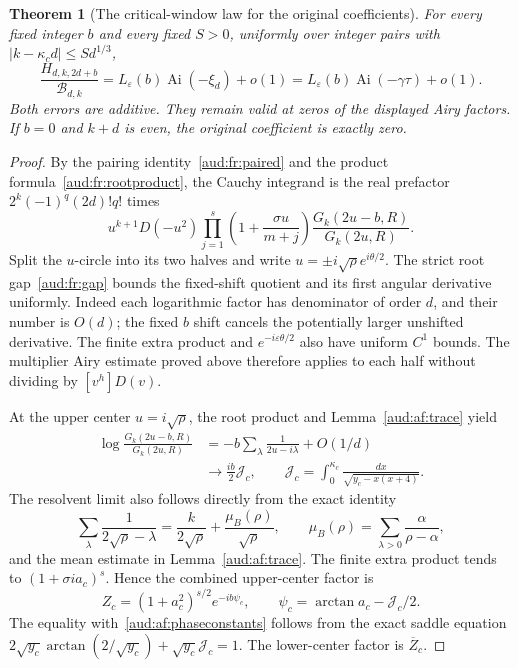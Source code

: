 \documentclass[11pt,a4paper]{article}
\numberwithin{equation}{section}
\newtheorem{theorem}{Theorem}[section]
\newcommand{\Ai}{\operatorname{Ai}}
\begin{document}
\begin{theorem}[The critical-window law for the original coefficients]\label{aud:af:fullAiry}
For every fixed integer $b$ and every fixed $S>0$, uniformly over integer pairs with $|k-\kappa_cd|\le S d^{1/3}$,
\begin{equation}\label{aud:af:fullformula}
 \frac{H_{d,k,2d+b}}{\mathcal B_{d,k}}
 =L_\varepsilon(b)\Ai(-\xi_d)+o(1)
 =L_\varepsilon(b)\Ai(-\gamma\tau)+o(1).
\end{equation}
Both errors are additive. They remain valid at zeros of the displayed Airy factors. If $b=0$ and $k+d$ is even, the original coefficient is exactly zero.
\end{theorem}
\begin{proof}
By the pairing identity~\eqref{aud:fr:paired} and the product formula~\eqref{aud:fr:rootproduct}, the Cauchy integrand is the real prefactor $2^k(-1)^q(2d)!q!$ times
\[
 u^{k+1}D(-u^2)
 \prod_{j=1}^s\left(1+\frac{\sigma u}{m+j}\right)
 \frac{G_k(2u-b,R)}{G_k(2u,R)}.
\]
Split the $u$-circle into its two halves and write
$u=\pm i\sqrt\rho e^{i\theta/2}$. The strict root gap~\eqref{aud:fr:gap} bounds the fixed-shift quotient and its first angular derivative uniformly. Indeed each logarithmic factor has denominator of order $d$, and their number is $O(d)$; the fixed $b$ shift cancels the potentially larger unshifted derivative. The finite extra product and $e^{-i\varepsilon\theta/2}$ also have uniform $C^1$ bounds. The multiplier Airy estimate proved above therefore applies to each half without dividing by $[v^h]D(v)$.

At the upper center $u=i\sqrt\rho$, the root product and Lemma~\ref{aud:af:trace} yield
\begin{align*}
 \log\frac{G_k(2u-b,R)}{G_k(2u,R)}
 &=-b\sum_\lambda\frac1{2u-i\lambda}+O(1/d)\\
 &\longrightarrow\frac{ib}{2}\mathcal J_c,
 \qquad
 \mathcal J_c=\int_0^{\kappa_c}\frac{dx}{\sqrt{y_c-x(x+4)}}.
\end{align*}
The resolvent limit also follows directly from the exact identity
\[
 \sum_\lambda\frac1{2\sqrt\rho-\lambda}
 =\frac{k}{2\sqrt\rho}+\frac{\mu_B(\rho)}{\sqrt\rho},
 \qquad \mu_B(\rho)=\sum_{\lambda>0}\frac{\alpha}{\rho-\alpha},
\]
and the mean estimate in Lemma~\ref{aud:af:trace}.
The finite extra product tends to $(1+\sigma ia_c)^s$. Hence the combined upper-center factor is
\[
 Z_c=(1+a_c^2)^{s/2}e^{-ib\psi_c},\qquad
 \psi_c=\arctan a_c-\mathcal J_c/2.
\]
The equality with~\eqref{aud:af:phaseconstants} follows from the exact saddle equation
$2\sqrt{y_c}\arctan(2/\sqrt{y_c})+\sqrt{y_c}\mathcal J_c=1$.
The lower-center factor is $\overline Z_c$.


\end{proof}
\end{document}
